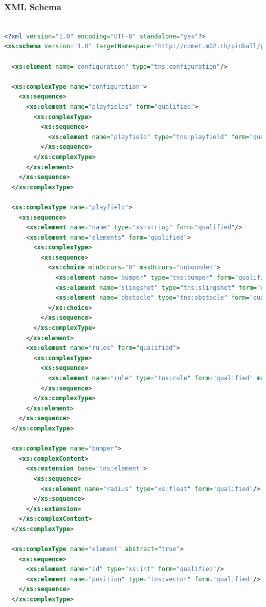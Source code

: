 \documentclass[fontsize=12pt,
               paper=a4,
               twoside=false,
               parskip=half,
               ]{scrartcl}
\begin{document}
\subsubsection{XML Schema}

\begin{lstlisting}[language=xml,label=lst:default_playfield,caption={schema for playfields.xml}]

<?xml version="1.0" encoding="UTF-8" standalone="yes"?>
<xs:schema version="1.0" targetNamespace="http://comet.m02.ch/pinball/playfield" xmlns:tns="http://comet.m02.ch/pinball/playfield" xmlns:xs="http://www.w3.org/2001/XMLSchema">

  <xs:element name="configuration" type="tns:configuration"/>

  <xs:complexType name="configuration">
    <xs:sequence>
      <xs:element name="playfields" form="qualified">
        <xs:complexType>
          <xs:sequence>
            <xs:element name="playfield" type="tns:playfield" form="qualified" maxOccurs="unbounded"/>
          </xs:sequence>
        </xs:complexType>
      </xs:element>
    </xs:sequence>
  </xs:complexType>

  <xs:complexType name="playfield">
    <xs:sequence>
      <xs:element name="name" type="xs:string" form="qualified"/>
      <xs:element name="elements" form="qualified">
        <xs:complexType>
          <xs:sequence>
            <xs:choice minOccurs="0" maxOccurs="unbounded">
              <xs:element name="bumper" type="tns:bumper" form="qualified"/>
              <xs:element name="slingshot" type="tns:slingshot" form="qualified"/>
              <xs:element name="obstacle" type="tns:obstacle" form="qualified"/>
            </xs:choice>
          </xs:sequence>
        </xs:complexType>
      </xs:element>
      <xs:element name="rules" form="qualified">
        <xs:complexType>
          <xs:sequence>
            <xs:element name="rule" type="tns:rule" form="qualified" maxOccurs="unbounded"/>
          </xs:sequence>
        </xs:complexType>
      </xs:element>
    </xs:sequence>
  </xs:complexType>

  <xs:complexType name="bumper">
    <xs:complexContent>
      <xs:extension base="tns:element">
        <xs:sequence>
          <xs:element name="radius" type="xs:float" form="qualified"/>
        </xs:sequence>
      </xs:extension>
    </xs:complexContent>
  </xs:complexType>

  <xs:complexType name="element" abstract="true">
    <xs:sequence>
      <xs:element name="id" type="xs:int" form="qualified"/>
      <xs:element name="position" type="tns:vector" form="qualified"/>
    </xs:sequence>
  </xs:complexType>


\end{lstlisting}
\end{document}
